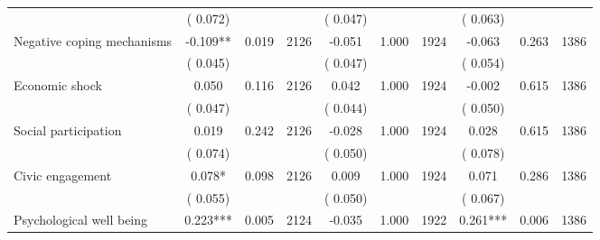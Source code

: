 \begin{tabular}{l*{9}{c}}
                               &        (       0.072) & &                                                                 &       (       0.047) & &                                                          &       (       0.063) & &  \\ 
 Negative coping mechanisms                 &             -0.109**          &        0.019 & 2126          &             -0.051 &        1.000 & 1924                   &       -0.063 &        0.263 & 1386                 \\ 
                               &        (       0.045) & &                                                                 &       (       0.047) & &                                                          &       (       0.054) & &  \\ 
 Economic shock                 &              0.050          &        0.116 & 2126          &              0.042 &        1.000 & 1924                   &       -0.002 &        0.615 & 1386                 \\ 
                               &        (       0.047) & &                                                                 &       (       0.044) & &                                                          &       (       0.050) & &   \\ 
 Social participation                 &              0.019          &        0.242 & 2126          &             -0.028 &        1.000 & 1924                   &        0.028 &        0.615 & 1386                 \\ 
                               &        (       0.074) & &                                                                 &       (       0.050) & &                                                          &       (       0.078) & &   \\ 
 Civic engagement                 &              0.078*          &        0.098 & 2126          &              0.009 &        1.000 & 1924                   &        0.071 &        0.286 & 1386                 \\ 
                               &        (       0.055) & &                                                                 &       (       0.050) & &                                                          &       (       0.067) & &  \\ 
 Psychological well being                &              0.223***        &        0.005 & 2124        &             -0.035 &        1.000 & 1922               &        0.261*** &        0.006 & 1386       \\ 

\end{tabular}
